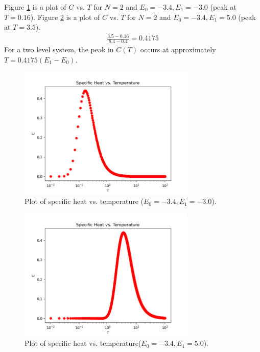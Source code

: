 \documentclass{article}
\begin{document}
\skipproblem

\clearpage

\problem
Figure \ref{fig:fig2} is a plot of $C$ vs. $T$ for $N = 2$ and $E_0 = -3.4, E_1 = -3.0$ (peak at $T = 0.16$). Figure \ref{fig:fig3} is a plot of $C$ vs. $T$  for $N = 2$ and $E_0 = -3.4, E_1 = 5.0$ (peak at $T = 3.5$).
\begin{equation}
    \begin{split}
        \frac{3.5 - 0.16}{8.4 - 0.4} = 0.4175
    \end{split}
\end{equation}
For a two level system, the peak in $C(T)$ occurs at approximately $T = 0.4175(E_1 - E_0)$.

\begin{figure}[!htb]
    \centering
    \includegraphics[width=0.75\textwidth]{../code/phy112l_lab1/1-10a.png}
    \caption{Plot of specific heat vs. temperature ($E_0 = -3.4, E_1 = -3.0$).}
    \label{fig:fig2}
\end{figure}
\begin{figure}[!htb]
    \centering
    \includegraphics[width=0.75\textwidth]{../code/phy112l_lab1/1-10b.png}
    \caption{Plot of specific heat vs. temperature($E_0 = -3.4, E_1 = 5.0$).}
    \label{fig:fig3}
\end{figure}
\end{document}
